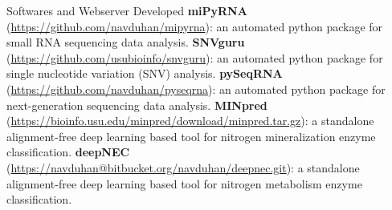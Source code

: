 \begin{rubric}{Softwares and Webserver Developed}
\entrys[]\textbf{miPyRNA} (\href{https://github.com/navduhan/mipyrna}{https://github.com/navduhan/mipyrna}): an automated python package for small RNA sequencing data analysis.
\entrys[]\textbf{SNVguru} (\href{https://github.com/usubioinfo/snvguru}{https://github.com/usubioinfo/snvguru}): an automated python package for single nucleotide variation (SNV) analysis.
\entrys[]\textbf{pySeqRNA} (\href{https://github.com/navduhan/pyseqrna}{https://github.com/navduhan/pyseqrna}): an automated python package for next-generation sequencing data analysis.
\entrys[]\textbf{MINpred} (\href{https://bioinfo.usu.edu/minpred/download/minpred.tar.gz }{https://bioinfo.usu.edu/minpred/download/minpred.tar.gz}): a standalone alignment-free deep learning based tool for nitrogen mineralization enzyme classification.
\entrys[]\textbf{deepNEC} (\href{https://navduhan@bitbucket.org/navduhan/deepnec.git }{https://navduhan@bitbucket.org/navduhan/deepnec.git}): a standalone alignment-free deep learning based tool for nitrogen metabolism enzyme classification.


\end{rubric}
